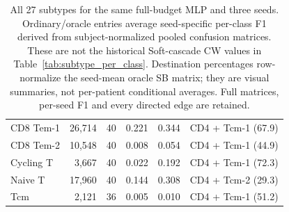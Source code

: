 \begin{table}[H]
\begin{tabular}{lrrr r l}
CD8 Tem-1 & 26,714 & 40 & 0.221 & 0.344 & CD4 + Tcm-1 (67.9) \\
CD8 Tem-2 & 10,548 & 40 & 0.008 & 0.054 & CD4 + Tcm-1 (44.9) \\
Cycling T & 3,667 & 40 & 0.022 & 0.192 & CD4 + Tcm-1 (72.3) \\
Naive T & 17,960 & 40 & 0.144 & 0.308 & CD4 + Tcm-2 (29.3) \\
Tcm & 2,121 & 36 & 0.005 & 0.010 & CD4 + Tcm-1 (51.2) \\
\bottomrule
\end{tabular}
\caption{All 27 subtypes for the same full-budget MLP and three seeds. Ordinary/oracle entries average seed-specific per-class F1 derived from subject-normalized pooled confusion matrices. These are not the historical Soft-cascade CW values in Table~\ref{tab:subtype_per_class}. Destination percentages row-normalize the seed-mean oracle SB matrix; they are visual summaries, not per-patient conditional averages. Full matrices, per-seed F1 and every directed edge are retained.}
\label{tab:mlp_subtype_errors}
\end{table}
